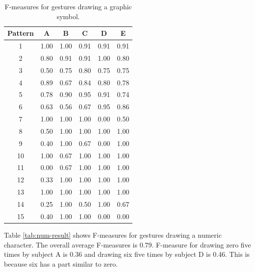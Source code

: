 \documentclass{sigchi-ext}
\begin{document}
        \begin{table}[!t]
        \centering
            \caption{F-measures for gestures drawing a graphic symbol.}
            \label{tab:result}
            \begin{tabular}{c|ccccc}\hline\hline
                Pattern & A & B & C & D & E \\ \hline
                1  & 1.00  & 1.00 & 0.91 & 0.91 & 0.91 \\
                2  & 0.80  & 0.91 & 0.91 & 1.00 & 0.80 \\
                3  & 0.50  & 0.75 & 0.80 & 0.75 & 0.75 \\
                4  & 0.89  & 0.67 & 0.84 & 0.80 & 0.78 \\
                5  & 0.78  & 0.90 & 0.95 & 0.91 & 0.74 \\
                6  & 0.63  & 0.56 & 0.67 & 0.95 & 0.86 \\
                7  & 1.00  & 1.00 & 1.00 & 0.00 & 0.50 \\
                8  & 0.50  & 1.00 & 1.00 & 1.00 & 1.00 \\
                9  & 0.40  & 1.00 & 0.67 & 0.00 & 1.00 \\
                10 & 1.00  & 0.67 & 1.00 & 1.00 & 1.00 \\
                11 & 0.00  & 0.67 & 1.00 & 1.00 & 1.00 \\
                12 & 0.33  & 1.00 & 1.00 & 1.00 & 1.00 \\
                13 & 1.00  & 1.00 & 1.00 & 1.00 & 1.00 \\
                14 & 0.25  & 1.00 & 0.50 & 1.00 & 0.67 \\
                15 & 0.40  & 1.00 & 1.00 & 0.00 & 0.00 \\\hline
            \end{tabular}
        \end{table}

        Table \ref{tab:num-result} shows F-measures for gestures drawing a numeric character. The overall average F-measures is 0.79. F-measure for drawing zero five times by subject A is 0.36 and drawing six five times by subject D is 0.46. This is because six has a part similar to zero. 
\end{document}
